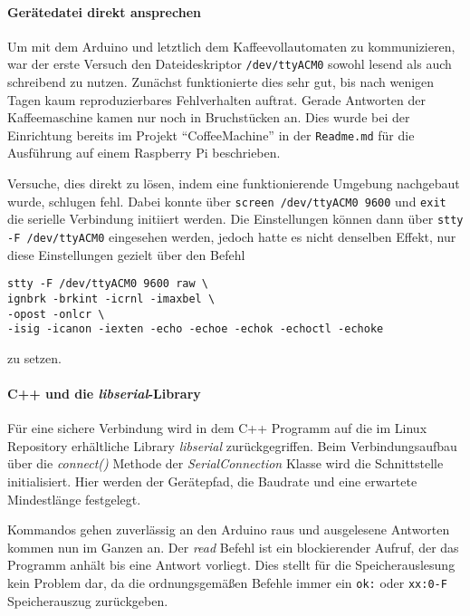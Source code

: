 \paragraph{Gerätedatei direkt ansprechen}
Um mit dem Arduino und letztlich dem Kaffeevollautomaten zu kommunizieren, war der erste Versuch den Dateideskriptor \texttt{/dev/ttyACM0} sowohl lesend als auch schreibend zu nutzen.
Zunächst funktionierte dies sehr gut, bis nach wenigen Tagen kaum reproduzierbares Fehlverhalten auftrat.
Gerade Antworten der Kaffeemaschine kamen nur noch in Bruchstücken an.
Dies wurde bei der Einrichtung bereits im Projekt "`CoffeeMachine"'\cite{GitCoffeeMachine} in der \texttt{Readme.md} für die Ausführung auf einem Raspberry Pi beschrieben.

Versuche, dies direkt zu lösen, indem eine funktionierende Umgebung nachgebaut wurde, schlugen fehl.
Dabei konnte über \texttt{screen /dev/ttyACM0 9600} und \texttt{exit} die serielle Verbindung initiiert werden.
Die Einstellungen können dann über \texttt{stty -F /dev/ttyACM0} eingesehen werden, jedoch hatte es nicht denselben Effekt, nur diese Einstellungen gezielt über den Befehl
\begin{lstlisting}[label=lst:stty,caption={stty zum setzen der Verbindungseinstellungen}]
stty -F /dev/ttyACM0 9600 raw \
ignbrk -brkint -icrnl -imaxbel \
-opost -onlcr \
-isig -icanon -iexten -echo -echoe -echok -echoctl -echoke
\end{lstlisting}
zu setzen.

\paragraph{C++ und die \textit{libserial}-Library}
Für eine sichere Verbindung wird in dem C++ Programm auf die im Linux Repository erhältliche Library \textit{libserial} zurückgegriffen.
Beim Verbindungsaufbau über die \textit{connect()} Methode der \textit{SerialConnection} Klasse wird die Schnittstelle initialisiert.
Hier werden der Gerätepfad, die Baudrate und eine erwartete Mindestlänge festgelegt.

Kommandos gehen zuverlässig an den Arduino raus und ausgelesene Antworten kommen nun im Ganzen an.
Der \textit{read} Befehl ist ein blockierender Aufruf, der das Programm anhält bis eine Antwort vorliegt.
Dies stellt für die Speicherauslesung kein Problem dar, da die ordnungsgemäßen Befehle immer ein \texttt{ok:} oder \texttt{xx:0-F} Speicherauszug zurückgeben.

